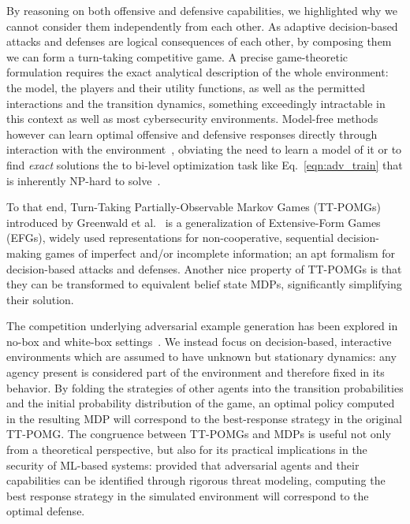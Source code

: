 By reasoning on both offensive and defensive capabilities, we highlighted why we cannot consider them independently from each other.
As adaptive decision-based attacks and defenses are logical consequences of each other, by composing them we can form a turn-taking competitive game.
A precise game-theoretic formulation requires the exact analytical description of the whole environment: the model, the players and their utility functions, as well as the permitted interactions and the transition dynamics, something exceedingly intractable in this context as well as most cybersecurity environments.
Model-free methods however can learn optimal offensive and defensive responses directly through interaction with the environment~\cite{sengupta2020multi, schulman2017proximal}, obviating the need to learn a model of it or to find \emph{exact} solutions the to bi-level optimization task like Eq.~\eqref{eqn:adv_train} that is inherently NP-hard to solve~\cite{bruckner2011stackelberg}.

To that end, Turn-Taking Partially-Observable Markov Games (TT-POMGs) introduced by Greenwald et al.~\cite{greenwald2017solving} is a generalization of Extensive-Form Games (EFGs), widely used representations for non-cooperative, sequential decision-making games of imperfect and/or incomplete information; an apt formalism for decision-based attacks and defenses.
Another nice property of TT-POMGs is that they can be transformed to equivalent belief state MDPs, significantly simplifying their solution.

The competition underlying adversarial example generation has been explored in no-box and white-box settings~\cite{bose2020adversarial, gao2022achieving}.
We instead focus on decision-based, interactive environments which are assumed to have unknown but stationary dynamics: any agency present is considered part of the environment and therefore fixed in its behavior.
By folding the strategies of other agents into the transition probabilities and the initial probability distribution of the game, an optimal policy computed in the resulting MDP will correspond to the best-response strategy in the original TT-POMG.
The congruence between TT-POMGs and MDPs is useful not only from a theoretical perspective, but also for its practical implications in the security of ML-based systems: provided that adversarial agents and their capabilities can be identified through rigorous threat modeling, computing the best response strategy in the simulated environment will correspond to the optimal defense.

